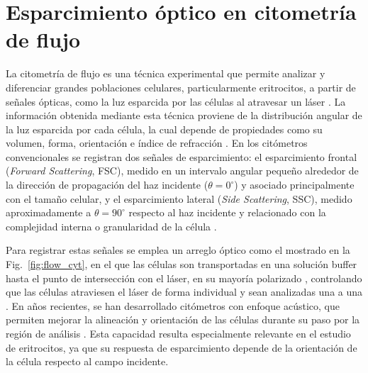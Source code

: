 \section{Esparcimiento óptico en citometría de flujo}
\label{section:flow_cytometry}

%
%
%

La citometría de flujo es una técnica experimental que permite analizar y diferenciar grandes poblaciones celulares, particularmente eritrocitos, a partir de señales ópticas, como la luz esparcida por las células al atravesar un láser \cite{bectondickinsonIntroductionFlowCytometry2000}. La información obtenida mediante esta técnica proviene de la distribución angular de la luz esparcida por cada célula, la cual depende de propiedades como su volumen, forma, orientación e índice de refracción \cite{bectondickinsonIntroductionFlowCytometry2000}. En los citómetros convencionales se registran dos señales de esparcimiento: el esparcimiento frontal (\textit{Forward Scattering}, FSC), medido en un intervalo angular pequeño alrededor de la dirección de propagación del haz incidente ($\theta=0^{\circ}$) y asociado principalmente con el tamaño celular, y el esparcimiento lateral (\textit{Side Scattering}, SSC), medido aproximadamente a $\theta=90^\circ$ respecto al haz incidente y relacionado con la complejidad interna o granularidad de la célula \cite{mckinnonFlowCytometryOverview2018}. 

Para registrar estas señales se emplea un arreglo óptico como el mostrado en la Fig.~\ref{fig:flow_cyt}, en el que las células son transportadas en una solución buffer hasta el punto de intersección con el láser, en su mayoría polarizado \cite{asburyPolarizationScatterFluorescence2000}, controlando que las células atraviesen el láser de forma individual y sean analizadas una a una \cite{mckinnonFlowCytometryOverview2018}. En años recientes, se han desarrollado citómetros con enfoque acústico, que permiten mejorar la alineación y orientación de las células durante su paso por la región de análisis \cite{giengerAssessmentDeformationHuman2019}. Esta capacidad resulta especialmente relevante en el estudio de eritrocitos, ya que su respuesta de esparcimiento depende de la orientación de la célula respecto al campo incidente. 

